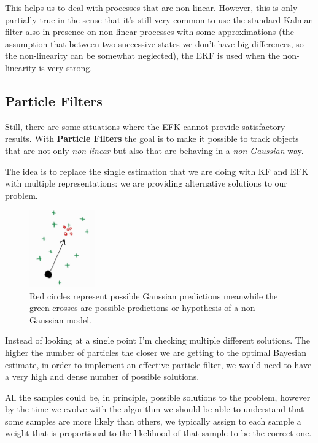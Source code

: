 This helps us to deal with processes that are non-linear. However, this is only partially true in the sense that it's still very common to use the standard Kalman filter also in presence on non-linear processes with some approximations (the assumption that between two successive states we don't have big differences, so the non-linearity can be somewhat neglected), the EKF is used when the non-linearity is very strong.

\subsection{Particle Filters} 

Still, there are some situations where the EFK cannot provide satisfactory results. With \textbf{Particle Filters} the goal is to make it possible to track objects that are not only \textit{non-linear} but also that are behaving in a \textit{non-Gaussian} way.

The idea is to replace the single estimation that we are doing with KF and EFK with multiple representations: we are providing alternative solutions to our problem. 

\begin{figure}[H]
    \centering
    \includegraphics[width=0.25\textwidth]{Figures/nongaus.jpg}
    \caption{Red circles represent possible Gaussian predictions meanwhile the green crosses are possible predictions or hypothesis of a non-Gaussian model.}
    \label{img:nongaus}
\end{figure}

Instead of looking at a single point I'm checking multiple different solutions. The higher the number of particles the closer we are getting to the optimal Bayesian estimate, in order to implement an effective particle filter, we would need to have a very high and dense number of possible solutions.

All the samples could be, in principle, possible solutions to the problem, however by the time we evolve with the algorithm we should be able to understand that some samples are more likely than others, we typically assign to each sample a weight that is proportional to the likelihood of that sample to be the correct one.

